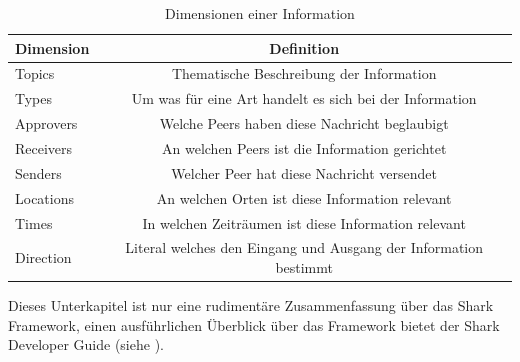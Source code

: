 \begin{table}[H]
	\begin{center}
		\begin{tabular}{l|c} 	
			Dimension & Definition \\
			\hline
			Topics & Thematische Beschreibung der Information\\
			Types & Um was für eine Art handelt es sich bei der Information\\
			Approvers & Welche Peers haben diese Nachricht beglaubigt\\
			Receivers & An welchen Peers ist die Information gerichtet\\
			Senders & Welcher Peer hat diese Nachricht versendet\\
			Locations & An welchen Orten ist diese Information relevant\\
			Times & In welchen Zeiträumen ist diese Information relevant\\
			Direction & Literal welches den Eingang und Ausgang der Information bestimmt\\
		\end{tabular}
		\caption{Dimensionen einer Information}
		\label{tab:dimension}
	\end{center}
\end{table}
Dieses Unterkapitel ist nur eine rudimentäre Zusammenfassung über das Shark Framework, einen ausführlichen Überblick über das Framework bietet der Shark Developer \mbox{Guide} (siehe \citet[S. 7ff]{Schwotzer2014}).
